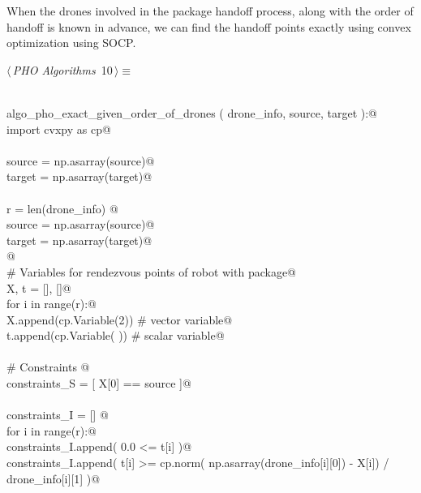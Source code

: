 \documentclass[12.0pt]{report}
\begin{document}
When the drones involved in the package handoff process, along with the order of handoff is known in advance, we can find the handoff points exactly
using convex optimization using SOCP. 


\begin{flushleft} \small
\begin{minipage}{\linewidth}\label{scrap5}\raggedright\small
{} $\langle\,${\itshape PHO Algorithms}\nobreak\ {\footnotesize {10}}$\,\rangle\equiv$
\vspace{-1ex}
\begin{list}{}{} \item
\mbox{}\verb@@\\
\mbox{}\verb@def algo_pho_exact_given_order_of_drones ( drone_info, source, target ):@\\
\mbox{}\verb@    import cvxpy as cp@\\
\mbox{}\verb@@\\
\mbox{}\verb@    source = np.asarray(source)@\\
\mbox{}\verb@    target = np.asarray(target)@\\
\mbox{}\verb@@\\
\mbox{}\verb@    r = len(drone_info) @\\
\mbox{}\verb@    source = np.asarray(source)@\\
\mbox{}\verb@    target = np.asarray(target)@\\
\mbox{}\verb@    @\\
\mbox{}\verb@    # Variables for rendezvous points of robot with package@\\
\mbox{}\verb@    X, t = [], []@\\
\mbox{}\verb@    for i in range(r):@\\
\mbox{}\verb@       X.append(cp.Variable(2)) # vector variable@\\
\mbox{}\verb@       t.append(cp.Variable( )) # scalar variable@\\
\mbox{}\verb@@\\
\mbox{}\verb@    # Constraints @\\
\mbox{}\verb@    constraints_S = [  X[0] == source ]@\\
\mbox{}\verb@@\\
\mbox{}\verb@    constraints_I = [] @\\
\mbox{}\verb@    for i in range(r):@\\
\mbox{}\verb@        constraints_I.append( 0.0 <= t[i] )@\\
\mbox{}\verb@        constraints_I.append( t[i] >= cp.norm( np.asarray(drone_info[i][0]) - X[i]) / drone_info[i][1] )@\\

\end{list}
\end{minipage}
\end{flushleft}
\end{document}
